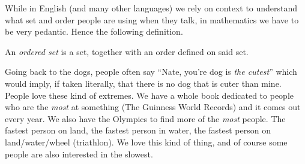 \documentclass[../../templates/section]{subfiles}
\begin{document}
While in English (and many other languages) we rely on context to understand
what set and order people are using when they talk, in mathematics we have to
be very pedantic. Hence the following definition.

\begin{definition}\label{def:ordered-set}
    An \emph{ordered set} is a set, together with an order defined on said set.
\end{definition}

Going back to the dogs, people often say ``Nate, you're dog is \emph{the
cutest}'' which would imply, if taken literally, that there is no dog that is
cuter than mine. People love these kind of extremes. We have a whole book
dedicated to people who are the \emph{most} at something (The Guinness World
Records) and it comes out every year. We also have the Olympics to find more of
the \emph{most} people. The fastest person on land, the fastest person in
water, the fastest person on land/water/wheel (triathlon). We love this kind of
thing, and of course some people are also interested in the slowest.
\end{document}
